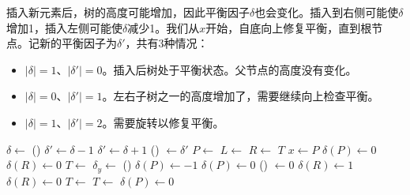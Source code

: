 \documentclass[b5paper]{ctexart}
\begin{document}
插入新元素后，树的高度可能增加，因此平衡因子$\delta$也会变化。插入到右侧可能使$\delta$增加1，插入左侧可能使$\delta$减少1。我们从$x$开始，自底向上修复平衡，直到根节点。记新的平衡因子为$\delta'$，共有3种情况：

\begin{itemize}
\item $|\delta| = 1$、$|\delta'| = 0$。插入后树处于平衡状态。父节点的高度没有变化。

\item $|\delta| = 0$、$|\delta'| = 1$。左右子树之一的高度增加了，需要继续向上检查平衡。

\item $|\delta| = 1$、$|\delta'| = 2$。需要旋转以修复平衡。
\end{itemize}

\begin{algorithmic}[1]
    \State $\delta \gets $ \textproc{$\delta$}()
      \State $\delta' \gets \delta - 1$
    \Else
      \State $\delta' \gets \delta + 1$
    \EndIf
    \State \textproc{$\delta$}() $\gets \delta'$
    \State $P \gets $ 
    \State $L \gets $ 
    \State $R \gets $ 
     
      \State \Return $T$
     
      \State $x \gets P$
         
          \State $\delta(P) \gets 0$ 
          \State $\delta(R) \gets 0$
          \State $T \gets $ 
        \EndIf
         
          \State $\delta_y \gets $ \textproc{$\delta$}() 
            \State $\delta(P) \gets -1$
          \Else
            \State $\delta(P) \gets 0$
          \EndIf
          \State \textproc{$\delta$}() $\gets 0$
            \State $\delta(R) \gets 1$
          \Else
            \State $\delta(R) \gets 0$
          \EndIf
          \State $T \gets $ 
          \State $T \gets $ 
        \EndIf
      \EndIf
         
          \State $\delta(P) \gets 0$

\end{algorithmic}
\end{document}
